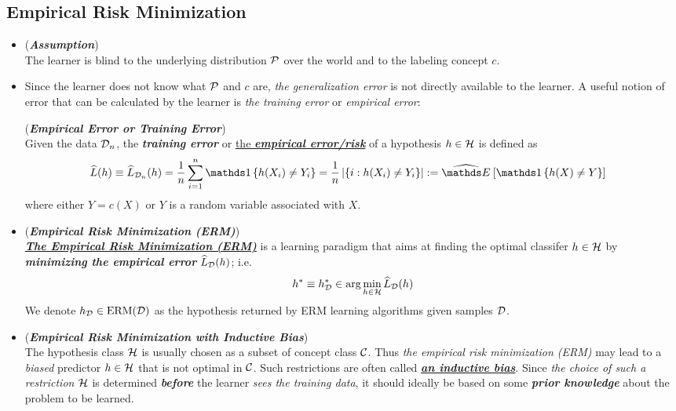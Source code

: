 \documentclass[11pt]{article}
\begin{document}
\subsection{Empirical Risk Minimization}
\begin{itemize}
\item \begin{remark} (\textbf{\emph{Assumption}})\\
The learner is blind to the underlying distribution ${\mathcal P}$ over the world and to the labeling concept $c$. 
\end{remark}

\item  Since the learner does not know what ${\mathcal P}$ and $c$ are, \emph{the generalization error} is not directly available to the learner. A useful notion of error that can be calculated by the learner is \emph{the training error} or \emph{empirical error}: 
\begin{definition} (\emph{\textbf{Empirical Error or Training Error}}) \\
Given the data ${\mathcal D}_n$, the \emph{\textbf{training error}} or \underline{the \emph{\textbf{empirical error/risk}}} of a hypothesis $h \in {\mathcal H}$ is defined as 
\begin{align*}
\widehat{L}(h)   \equiv \widehat{L}_{\cD_n}(h)  &= \frac{1}{n}\sum_{i=1}^{n}\ind{h(X_i)\neq Y_i} = \frac{1}{n}\abs{\set{i: h(X_i)\neq Y_i}} := \Em{}{\ind{h(X) \neq Y}}
\end{align*} where either $Y = c(X)$ or $Y$ is a random variable associated with $X$.
\end{definition}

\item \begin{definition} (\textbf{\emph{Empirical Risk Minimization (ERM)}}) \\
\underline{\emph{\textbf{The Empirical Risk Minimization (ERM)}}} is a learning paradigm that aims at finding the optimal classifer $h \in {\mathcal H}$ by \emph{\textbf{minimizing the empirical error}} $\widehat{L}_{{\mathcal D}}(h)$; i.e.
\begin{align*}
h^{*} \equiv h^{*}_{{\mathcal D}} \in \arg\min_{h \in {\mathcal H}}\widehat{L}_{{\mathcal D}}(h)
\end{align*} We denote $h_{{\mathcal D}} \in \text{ERM}({\mathcal D})$ as the hypothesis returned by ERM learning algorithms given samples ${\mathcal D}$. 
\end{definition}

\item \begin{remark} (\textbf{\emph{Empirical Risk Minimization with Inductive Bias}}) \\
The hypothesis class ${\mathcal H}$ is usually chosen as a subset of concept class ${\mathcal C}$. Thus \emph{the empirical risk minimization (ERM)} may lead to a \emph{biased} predictor $h \in {\mathcal H}$ that is not optimal in ${\mathcal C}$. Such restrictions are often called \underline{\emph{\textbf{an inductive bias}}}.  Since \emph{the choice of such a restriction ${\mathcal H}$} is determined \emph{\textbf{before}} the learner \emph{sees the training data}, it should ideally be based on some \emph{\textbf{prior knowledge}} about the problem to be learned. 
\end{remark}


\end{itemize}
\end{document}
